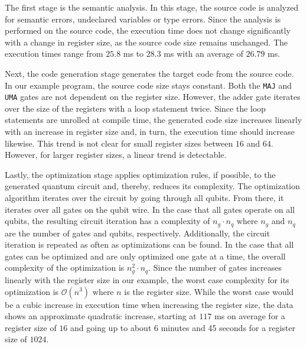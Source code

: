 The first stage is the semantic analysis. In this stage, the source code is analyzed for semantic errors, \eg undeclared variables or type errors. Since the analysis is performed on the source code, the execution time does not change significantly with a change in register size, as the source code size remains unchanged. The execution times range from $25.8$ ms to $28.3$ ms with an average of $26.79$ ms. 

Next, the code generation stage generates the target code from the source code. In our example program, the source code size stays constant. Both the \texttt{MAJ} and \texttt{UMA} gates are not dependent on the register size. However, the adder gate iterates over the size of the registers with a loop statement twice. Since the loop statements are unrolled at compile time, the generated code size increases linearly with an increase in register size and, in turn, the execution time should increase likewise. This trend is not clear for small register sizes between $16$ and $64$. However, for larger register sizes, a linear trend is detectable.

Lastly, the optimization stage applies optimization rules, if possible, to the generated quantum circuit and, thereby, reduces its complexity. The optimization algorithm iterates over the circuit by going through all qubits. From there, it iterates over all gates on the qubit wire. In the case that all gates operate on all qubits, the resulting circuit iteration has a complexity of $n_g \cdot n_q$ where $n_g$ and $n_q$ are the number of gates and qubits, respectively. Additionally, the circuit iteration is repeated as often as optimizations can be found. In the case that all gates can be optimized and are only optimized one gate at a time, the overall complexity of the optimization is $n_g^2 \cdot n_q$. Since the number of gates increases linearly with the register size in our example, the worst case complexity for its optimization is $\mathcal{O}(n^3)$ where $n$ is the register size. While the worst case would be a cubic increase in execution time when increasing the register size, the data shows an approximate quadratic increase, starting at $117$ ms on average for a register size of $16$ and going up to about $6$ minutes and 45 seconds for a register size of $1024$. 

